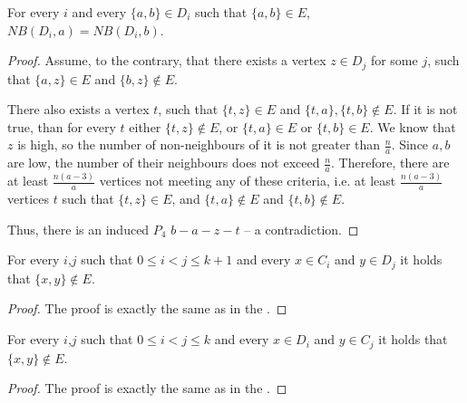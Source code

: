 \begin{theorem}
    For every $i$ and every $\{a, b\} \in D_i$ such that $\{a,b\} \in E$, $NB(D_i,a)=NB(D_i,b)$. 
\end{theorem}
\begin{proof}
     Assume, to the contrary, that there exists a vertex $z \in D_j$ for some $j$, such that $\{a,z\} \in E$ and $\{b,z\} \notin E$. 
     
     There also exists a vertex $t$, such that $\{t,z\} \in E$ and $\{t,a\}, \{t,b\} \notin E$. If it is not true, than for every $t$ either $\{t,z\} \notin E$, or $\{t,a\} \in E$ or $ \{t,b\} \in E$. We know that $z$ is high, so the number of non-neighbours of it is not greater than $\frac{n}{a}$. Since $a, b$ are low, the number of their neighbours does not exceed $\frac{n}{a}$. Therefore, there are at least $\frac{n(a-3)}{a}$ vertices not meeting any of these criteria, i.e. at least $\frac{n(a-3)}{a}$ vertices $t$ such that $\{t,z\} \in E$, and $\{t,a\} \notin E$ and $ \{t,b\} \notin E$.

     Thus, there is an induced $P_4$ $b-a-z-t$ -- a contradiction.
\end{proof}


\begin{theorem}
    For every $i$,$j$ such that $0 \leq i < j \leq k + 1$ and every $x \in C_i$ and $y \in D_j$ it holds that $\{x,y\} \notin E$. 
\end{theorem}
\begin{proof}
    The proof is exactly the same as in the .
\end{proof}

\begin{theorem}
    For every $i$,$j$ such that $0 \leq i < j \leq k$ and every $x \in D_i$ and $y \in C_j$ it holds that $\{x,y\} \notin E$. 
\end{theorem}
\begin{proof}
    The proof is exactly the same as in the .
\end{proof}

